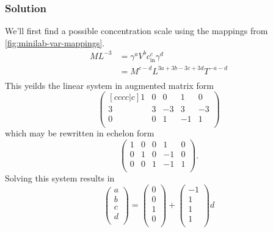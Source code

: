 \documentclass[12pt]{article}
\begin{document}
\subsubsection*{Solution}
We'll first find a possible concentration scale using the mappings from
\cref{fig:minilab-var-mappings}.
\begin{equation*}
  \begin{aligned}
    ML^{-3} &= \gamma^aV^bc_{\text{in}}^c\gamma^d \\
    &= M^{c-d}L^{3a+3b-3c+3d}T^{-a-d} \\
  \end{aligned}
\end{equation*}
This yeilds the linear system in augmented matrix form
\begin{equation*}
  \begin{pmatrix}[cccc|c]
    1 & 0 & 0 & 1 & 0 \\
    3 & 3 & -3 & 3 & -3 \\
    0 & 0 & 1 & -1 & 1 \\
  \end{pmatrix}
\end{equation*}
which may be rewritten in echelon form
\begin{equation*}
  \begin{pmatrix}
    1 & 0 & 0 & 1 & 0 \\
    0 & 1 & 0 & -1 & 0 \\
    0 & 0 & 1 & -1 & 1 \\
  \end{pmatrix}.
\end{equation*}
Solving this system results in
\begin{equation*}
  \begin{pmatrix}
    a \\ b \\ c \\ d \\
  \end{pmatrix} =
  \begin{pmatrix}
    0 \\ 0 \\ 1 \\ 0 \\
  \end{pmatrix} +
  \begin{pmatrix}
    -1 \\ 1 \\ 1 \\ 1 \\
  \end{pmatrix}d
\end{equation*}
\end{document}
